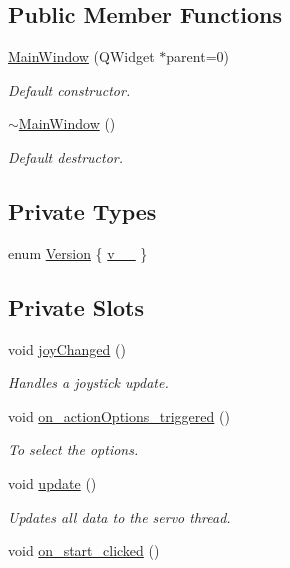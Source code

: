 \subsection*{Public Member Functions}
\begin{DoxyCompactItemize}
\item 
\hyperlink{a00005_a8b244be8b7b7db1b08de2a2acb9409db}{Main\+Window} (Q\+Widget $\ast$parent=0)
\begin{DoxyCompactList}\small\item\em Default constructor. \end{DoxyCompactList}\item 
\hyperlink{a00005_ae98d00a93bc118200eeef9f9bba1dba7}{$\sim$\+Main\+Window} ()
\begin{DoxyCompactList}\small\item\em Default destructor. \end{DoxyCompactList}\end{DoxyCompactItemize}
\subsection*{Private Types}
\begin{DoxyCompactItemize}
\item 
enum \hyperlink{a00005_a355d9f17965e5105226409313743cb9d}{Version} \{ \hyperlink{a00005_a355d9f17965e5105226409313743cb9daac0c8ddcec40274ec60fb95f59ba7aba}{v\+\_\+\_}
 \}
\end{DoxyCompactItemize}
\subsection*{Private Slots}
\begin{DoxyCompactItemize}
\item 
void \hyperlink{a00005_abb4c2d8a79c9f80010ea031366bf8226}{joy\+Changed} ()
\begin{DoxyCompactList}\small\item\em Handles a joystick update. \end{DoxyCompactList}\item 
void \hyperlink{a00005_a1dd57ccb62bc6f5a361aba6e088dd2e1}{on\+\_\+action\+Options\+\_\+triggered} ()
\begin{DoxyCompactList}\small\item\em To select the options. \end{DoxyCompactList}\item 
void \hyperlink{a00005_a128f71880d4b9683149023fc46fcc9f8}{update} ()
\begin{DoxyCompactList}\small\item\em Updates all data to the servo thread. \end{DoxyCompactList}\item 
void \hyperlink{a00005_ae66e9ab15f911b93fce0f161d2fde880}{on\+\_\+start\+\_\+clicked} ()
\end{DoxyCompactItemize}
